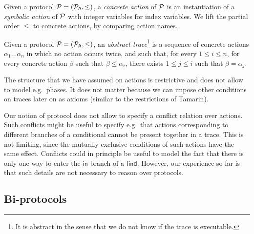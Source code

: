 \begin{definition}
  Given a protocol $\mathcal{P} = (\mathcal{P}_{\textsf{A}}, \leq)$, a \emph{concrete action} of $\mathcal{P}$ is an instantiation of a \emph{symbolic action} of $\mathcal{P}$ with integer variables for index variables. We lift the partial order $\leq$ to concrete actions, by comparing action names.
\end{definition}

\begin{definition}
  \label{def:trace}
  Given a protocol $\mathcal{P} = (\mathcal{P}_{\textsf{A}}, \leq)$,
  an \emph{abstract trace}\footnote{
    It is abstract in the sense that we do not know if the trace
    is executable. } is a sequence of concrete actions
  $\alpha_1 \dots \alpha_n$
  in which no action occurs twice, and such that,
  for every $1 \leq i \leq n$,
  for every concrete action $\beta$ such that $\beta \leq \alpha_i$,
  there exists $1 \leq j \leq i$ such that $\beta = \alpha_j$.
\end{definition}

\begin{remark}
  The structure that we have assumed on actions is restrictive and
  does not allow to model e.g.\ phases. It does not matter because we can
  impose other conditions on traces later on as axioms (similar to the
  restrictions of Tamarin).
\end{remark}

\begin{remark}
  Our notion of protocol does not allow to specify a conflict relation
  over actions. Such conflicts might be useful to specify e.g.\ that
  actions corresponding to different branches of a conditional cannot
  be present together in a trace. This is not limiting, since the
  mutually exclusive conditions of such actions have the same effect.
  Conflicts could in principle be useful to model the fact that there is only
  one way to enter the $\mathsf{in}$ branch of a $\mathsf{find}$. However,
  our experience so far is that such details are not necessary to reason
  over protocols. 
\end{remark}

\subsection{Bi-protocols}

